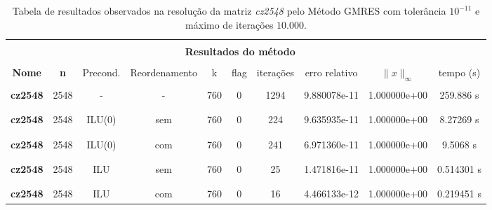 \begin{table}[ht]
    \centering
    \begin{tabular}{|c|c|c|c|c|c|c|c|c|c|}
        \hline \rowcolor{Gray}
        \multicolumn{10}{|c|}{\bfseries Tabela do Método GMRES com tolerância $10^{-11}$ e máximo de iterações $10.000$ }\\
        \hline \rowcolor{Gray}  \multicolumn{2}{|c|}{} & \multicolumn{8}{|c|}{} \\
         [-1em]  \rowcolor{Gray}
         \multicolumn{2}{|c|}{\bfseries Informações da matriz } & \multicolumn{8}{|c|}{\bfseries Resultados do método }\\
         \hline \rowcolor{Gray} & & & & & & & & & \\
         [-1em]
         \rowcolor{Gray}
         \bfseries Nome & \bfseries n & Precond. & Reordenamento & k & flag & iterações &
         erro relativo &
         $\|x\|_\infty$  & tempo (s) \\
         \hline & & & & & & & & & \\
         [-1em] \bfseries cz2548 & 2548 & - & - & 760 & 0 & 1294 & 9.880078e-11 & 1.000000e+00 & 259.886 s \\ & & & & & & & & & \\ [-1em] \hline \\
         [-1em] \bfseries cz2548 & 2548 & ILU(0) & sem & 760 & 0 & 224 & 9.635935e-11 & 1.000000e+00 & 8.27269 s \\  & & & & & & & & & \\ [-1em] \hline \\
         [-1em] \bfseries cz2548 & 2548 & ILU(0) & com & 760 & 0 & 241 & 6.971360e-11 & 1.000000e+00 & 9.5068 s \\  & & & & & & & & & \\ [-1em] \hline \\
         [-1em] \bfseries cz2548 & 2548 & ILU & sem & 760 & 0 & 25 & 1.471816e-11 & 1.000000e+00 & 0.514301 s \\  & & & & & & & & & \\ [-1em] \hline \\
         [-1em] \bfseries cz2548 & 2548 & ILU & com & 760 & 0 & 16 & 4.466133e-12 & 1.000000e+00 & 0.219451 s \\ 
         \hline
    \end{tabular}
    \caption{Tabela de resultados observados na resolução da matriz \textit{cz2548} pelo Método GMRES com tolerância $10^{-11}$ e máximo de iterações $10.000$.}
    \label{tab:resultados-cz}
\end{table}